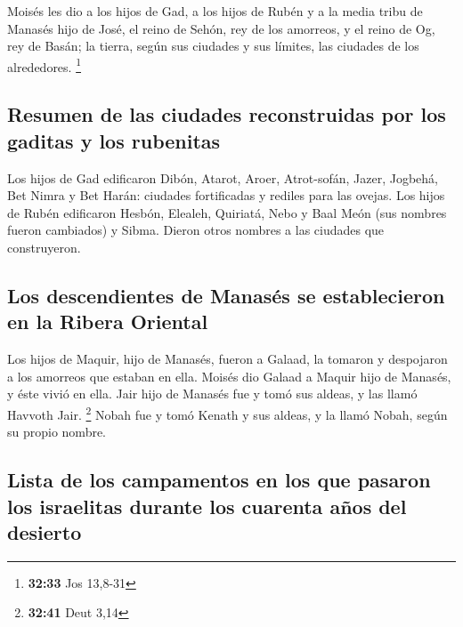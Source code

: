  Moisés les dio a los hijos de Gad, a los hijos de Rubén
y a la media tribu de Manasés hijo de José, el reino de Sehón, rey de
los amorreos, y el reino de Og, rey de Basán; la tierra, según sus
ciudades y sus límites, las ciudades de los alrededores. \footnote{\textbf{32:33}
  Jos 13,8-31}

\hypertarget{resumen-de-las-ciudades-reconstruidas-por-los-gaditas-y-los-rubenitas}{%
\subsection{Resumen de las ciudades reconstruidas por los gaditas y los
rubenitas}\label{resumen-de-las-ciudades-reconstruidas-por-los-gaditas-y-los-rubenitas}}

 Los hijos de Gad edificaron Dibón, Atarot, Aroer,
 Atrot-sofán, Jazer, Jogbehá,  Bet Nimra y
Bet Harán: ciudades fortificadas y rediles para las ovejas.
 Los hijos de Rubén edificaron Hesbón, Elealeh, Quiriatá,
 Nebo y Baal Meón (sus nombres fueron cambiados) y Sibma.
Dieron otros nombres a las ciudades que construyeron.

\hypertarget{los-descendientes-de-manasuxe9s-se-establecieron-en-la-ribera-oriental}{%
\subsection{Los descendientes de Manasés se establecieron en la Ribera
Oriental}\label{los-descendientes-de-manasuxe9s-se-establecieron-en-la-ribera-oriental}}

 Los hijos de Maquir, hijo de Manasés, fueron a Galaad,
la tomaron y despojaron a los amorreos que estaban en ella.
 Moisés dio Galaad a Maquir hijo de Manasés, y éste vivió
en ella.  Jair hijo de Manasés fue y tomó sus aldeas, y
las llamó Havvoth Jair. \footnote{\textbf{32:41} Deut 3,14}
 Nobah fue y tomó Kenath y sus aldeas, y la llamó Nobah,
según su propio nombre.

\hypertarget{lista-de-los-campamentos-en-los-que-pasaron-los-israelitas-durante-los-cuarenta-auxf1os-del-desierto}{%
\subsection{Lista de los campamentos en los que pasaron los israelitas
durante los cuarenta años del
desierto}\label{lista-de-los-campamentos-en-los-que-pasaron-los-israelitas-durante-los-cuarenta-auxf1os-del-desierto}}

